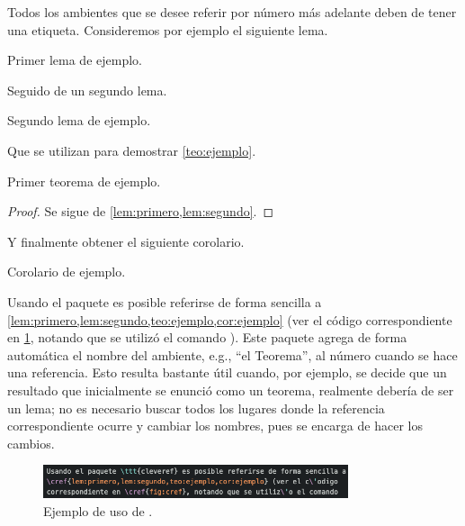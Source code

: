 Todos los ambientes que se desee referir por n\'umero m\'as adelante deben de
tener una etiqueta.  Consideremos por ejemplo el siguiente lema.

\begin{lema}
\label{lem:primero}
Primer lema de ejemplo.
\end{lema}

Seguido de un segundo lema.

\begin{lema}
\label{lem:segundo}
Segundo lema de ejemplo.
\end{lema}

Que se utilizan para demostrar \cref{teo:ejemplo}.

\begin{teorema}
\label{teo:ejemplo}
Primer teorema de ejemplo.
\end{teorema}

\begin{proof}
Se sigue de \cref{lem:primero,lem:segundo}.
\end{proof}

Y finalmente obtener el siguiente corolario.

\begin{corolario}
\label{cor:ejemplo}
Corolario de ejemplo.
\end{corolario}

Usando el paquete \href{http://tug.ctan.org/tex-archive/macros/latex/contrib/%
cleveref/cleveref.pdf}{} es posible referirse de
forma sencilla a \cref{lem:primero,lem:segundo,teo:ejemplo,cor:ejemplo} (ver el
c\'odigo correspondiente en \cref{fig:cref}, notando que se utiliz\'o el comando
).   Este paquete agrega de forma autom\'atica el
nombre del ambiente, e.g., ``el Teorema'', al n\'umero cuando se hace una
referencia.   Esto resulta bastante \'util cuando, por ejemplo, se decide que un
resultado que inicialmente se enunci\'o como un teorema, realmente deber\'ia de
ser un lema; no es necesario buscar todos los lugares donde la referencia
correspondiente ocurre y cambiar los nombres, pues  se encarga de
hacer los cambios.

\begin{figure}[H]
  \centering
  \includegraphics[width=0.8\textwidth]{recursos/capturas/cref}
  \caption{Ejemplo de uso de .}
  \label{fig:cref}
\end{figure}

